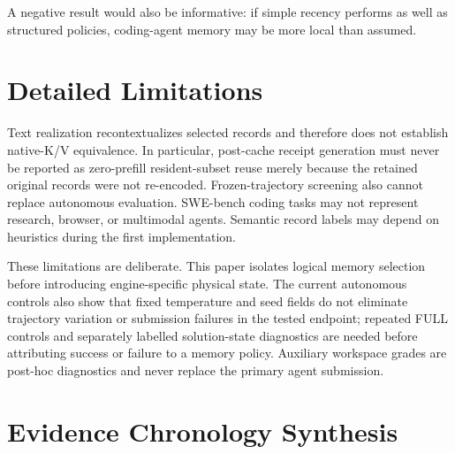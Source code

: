 \documentclass[11pt]{article}
\begin{document}
A negative result would also be informative: if simple recency performs as well
as structured policies, coding-agent memory may be more local than assumed.

\section{Detailed Limitations}

Text realization recontextualizes selected records and therefore does not
establish native-K/V equivalence.  In particular, post-cache receipt generation
must never be reported as zero-prefill resident-subset reuse merely because the
retained original records were not re-encoded. Frozen-trajectory screening also cannot replace
autonomous evaluation. SWE-bench coding tasks may not represent research,
browser, or multimodal agents. Semantic record labels may depend on heuristics
during the first implementation.

These limitations are deliberate. This paper isolates logical memory selection
before introducing engine-specific physical state. The current autonomous
controls also show that fixed temperature and seed fields do not eliminate
trajectory variation or submission failures in the tested endpoint; repeated
FULL controls and separately labelled solution-state diagnostics are needed
before attributing success or failure to a memory policy. Auxiliary workspace
grades are post-hoc diagnostics and never replace the primary agent submission.

\section{Evidence Chronology Synthesis}
\end{document}
